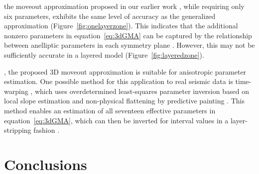  the moveout approximation proposed in our earlier work \cite[]{zoneortho}, while requiring only six parameters, exhibits the same level of accuracy as the generalized approximation (Figure~\ref{fig:onelayerzone}). This indicates that the additional nonzero parameters in equation~\ref{eq:3dGMA} can be captured by the relationship between anelliptic parameters in each symmetry plane \cite[]{zoneortho,zonemdshale}. However, this  may not be sufficiently accurate in a layered model (Figure~\ref{fig:layeredzone}).


, the proposed 3D moveout approximation is suitable for anisotropic parameter estimation.  One possible method for this application to real seismic data is time-warping \cite[]{will,lorenzovti,lorenzo3d}, which uses overdetermined least-squares parameter inversion based on local slope estimation and non-physical flattening by predictive painting \cite[]{fomelpredict}. This method enables  an estimation of all seventeen effective parameters in equation~\ref{eq:3dGMA}, which can then be inverted for interval values in a layer-stripping fashion \cite[]{zoneinterval}. 

\section{Conclusions}

